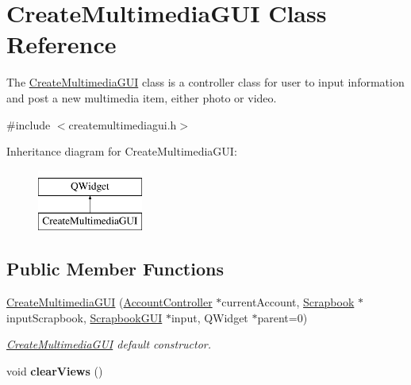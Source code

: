 \hypertarget{classCreateMultimediaGUI}{}\section{Create\+Multimedia\+G\+UI Class Reference}
\label{classCreateMultimediaGUI}


The \hyperlink{classCreateMultimediaGUI}{Create\+Multimedia\+G\+UI} class is a controller class for user to input information and post a new multimedia item, either photo or video.  




{\ttfamily \#include $<$createmultimediagui.\+h$>$}

Inheritance diagram for Create\+Multimedia\+G\+UI\+:\begin{figure}[H]
\begin{center}
\leavevmode
\includegraphics[height=2.000000cm]{classCreateMultimediaGUI}
\end{center}
\end{figure}
\subsection*{Public Member Functions}
\begin{DoxyCompactItemize}
\item 
\hyperlink{classCreateMultimediaGUI_ae1810913ce67e2e36d94f30d7d9043e5}{Create\+Multimedia\+G\+UI} (\hyperlink{classAccountController}{Account\+Controller} $\ast$current\+Account, \hyperlink{classScrapbook}{Scrapbook} $\ast$input\+Scrapbook, \hyperlink{classScrapbookGUI}{Scrapbook\+G\+UI} $\ast$input, Q\+Widget $\ast$parent=0)
\begin{DoxyCompactList}\small\item\em \hyperlink{classCreateMultimediaGUI}{Create\+Multimedia\+G\+UI} default constructor. \end{DoxyCompactList}\item 
void {\bfseries clear\+Views} ()\hypertarget{classCreateMultimediaGUI_aa33f1c3b780afe80ad46593b65297c93}{}\label{classCreateMultimediaGUI_aa33f1c3b780afe80ad46593b65297c93}

\end{DoxyCompactItemize}


